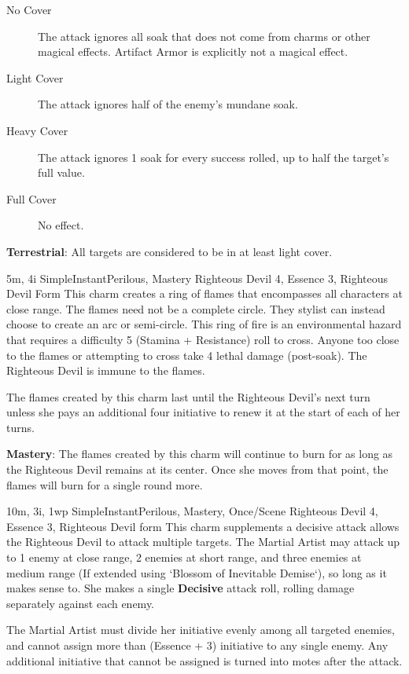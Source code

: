 \begin{description}
\item[No Cover] The attack ignores all soak that does not come from charms or other magical effects.
Artifact Armor is explicitly not a magical effect.
\item[Light Cover] The attack ignores half of the enemy's mundane soak.
\item[Heavy Cover] The attack ignores 1 soak for every success rolled, up to half the target's full value.
\item[Full Cover] No effect.
\end{description}

\textbf{Terrestrial}: All targets are considered to be in at least light cover.

{5m, 4i}
{Simple}{Instant}{Perilous, Mastery}
{Righteous Devil 4, Essence 3, Righteous Devil Form}
This charm creates a ring of flames that encompasses all characters at close range.
The flames need not be a complete circle.
They stylist can instead choose to create an arc or semi-circle.
This ring of fire is an environmental hazard that requires a difficulty 5 (Stamina + Resistance) roll to cross.
Anyone too close to the flames or attempting to cross take 4 lethal damage (post-soak).
The Righteous Devil is immune to the flames.

The flames created by this charm last until the Righteous Devil's next turn unless she pays an additional four initiative to renew it at the start of each of her turns.

\textbf{Mastery}: The flames created by this charm will continue to burn for as long as the Righteous Devil remains at its center.
Once she moves from that point, the flames will burn for a single round more.

{10m, 3i, 1wp}
{Simple}{Instant}{Perilous, Mastery, Once/Scene}
{Righteous Devil 4,  Essence 3, Righteous Devil form}
This charm supplements a decisive attack allows the Righteous Devil to attack multiple targets.
The Martial Artist may attack  up to
1 enemy at close range,
2 enemies at short range,
and three enemies at medium range
(If extended using `Blossom of Inevitable Demise`),
so long as it makes sense to.
She makes a single \textbf{Decisive} attack roll,
rolling damage separately against each enemy.

The Martial Artist must divide her initiative evenly among all targeted enemies,
and cannot assign more than (Essence + 3) initiative to any single enemy.
Any additional initiative that cannot be assigned is turned into motes after the attack.

